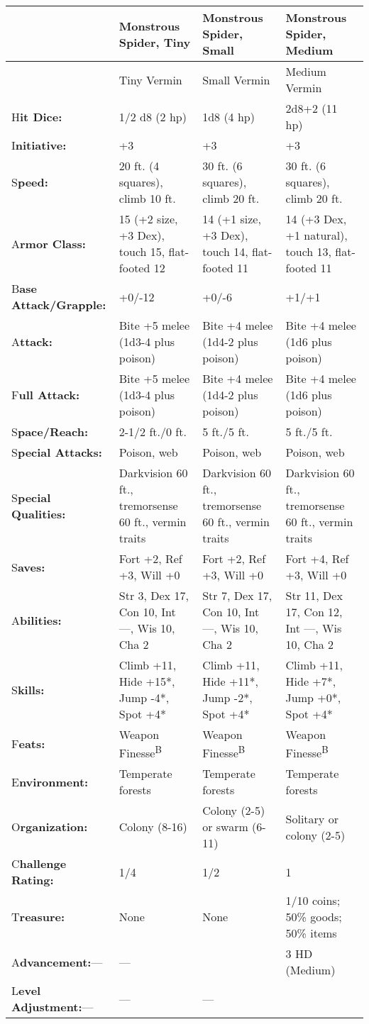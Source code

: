\documentclass{article}
\begin{document}
\begin{tabular}{|>{\raggedright}p{54pt}|>{\raggedright}p{82pt}|>{\raggedright}p{82pt}|>{\raggedright}p{82pt}|}
\hline
  & M\textbf{onstrous Spider, Tiny} & M\textbf{onstrous Spider, Small} & M\textbf{onstrous 
Spider, Medium}\tabularnewline
\hline
  & Tiny Vermin & Small Vermin & Medium Vermin\tabularnewline
\hline
H\textbf{it Dice:} & 1/2 d8 (2 hp) & 1d8 (4 hp) & 2d8+2 (11 hp)\tabularnewline
\hline
I\textbf{nitiative:} & +3 & +3 & +3\tabularnewline
\hline
S\textbf{peed:} & 20 ft. (4 squares), climb 10 ft. & 30 ft. (6 squares), climb 
20 ft. & 30 ft. (6 squares), climb 20 ft.\tabularnewline
\hline
A\textbf{rmor Class:} & 15 (+2 size, +3 Dex), touch 15, flat-footed 12 & 14 (+1 
size, +3 Dex), touch 14, flat-footed 11 & 14 (+3 Dex, +1 natural), touch 13, flat-footed 
11\tabularnewline
\hline
B\textbf{ase Attack/Grapple:} & +0/-12 & +0/-6 & +1/+1\tabularnewline
\hline
A\textbf{ttack:} & Bite +5 melee (1d3-4 plus poison) & Bite +4 melee (1d4-2 plus 
poison) & Bite +4 melee (1d6 plus poison)\tabularnewline
\hline
F\textbf{ull Attack:} & Bite +5 melee (1d3-4 plus poison) & Bite +4 melee (1d4-2 
plus poison) & Bite +4 melee (1d6 plus poison)\tabularnewline
\hline
S\textbf{pace/Reach:} & 2-1/2 ft./0 ft. & 5 ft./5 ft. & 5 ft./5 ft.\tabularnewline
\hline
S\textbf{pecial Attacks:} & Poison, web & Poison, web & Poison, web\tabularnewline
\hline
S\textbf{pecial Qualities:} & Darkvision 60 ft., tremorsense 60 ft., vermin traits & Darkvision 
60 ft., tremorsense 60 ft., vermin traits & Darkvision 60 ft., tremorsense 60 ft., 
vermin traits\tabularnewline
\hline
S\textbf{aves:} & Fort +2, Ref +3, Will +0 & Fort +2, Ref +3, Will +0 & Fort +4, 
Ref +3, Will +0\tabularnewline
\hline
A\textbf{bilities:} & Str 3, Dex 17, Con 10, Int ---, Wis 10, Cha 2 & Str 7, Dex 
17, Con 10, Int ---, Wis 10, Cha 2 & Str 11, Dex 17, Con 12, Int ---, Wis 10, Cha 
2\tabularnewline
\hline
S\textbf{kills:} & Climb +11, Hide +15*, Jump -4*, Spot +4* & Climb +11, Hide +11*, 
Jump -2*, Spot +4* & Climb +11, Hide +7*, Jump +0*, Spot +4*\tabularnewline
\hline
F\textbf{eats:} & Weapon Finesse\textsuperscript{B} & Weapon Finesse\textsuperscript{B} & Weapon 
Finesse\textsuperscript{B}\tabularnewline
\hline
E\textbf{nvironment:} & Temperate forests & Temperate forests & Temperate forests\tabularnewline
\hline
O\textbf{rganization:} & Colony (8-16) & Colony (2-5) or swarm (6-11) & Solitary 
or colony (2-5)\tabularnewline
\hline
C\textbf{hallenge Rating:} & 1/4 & 1/2 & 1\tabularnewline
\hline
T\textbf{reasure:} & None & None & 1/10 coins; 50\% goods; 50\% items\tabularnewline
\hline
A\textbf{dvancement:}--- & --- &  & 3 HD (Medium)\tabularnewline
\hline
L\textbf{evel Adjustment:}--- & --- & --- & \tabularnewline
\hline
\end{tabular}
\end{document}
